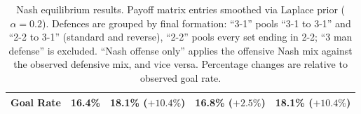 \begin{table}[h]
\begin{tabular}{lllll}
\midrule
Goal Rate & 16.4\% & 18.1\% ($+10.4\%$) & 16.8\% ($+2.5\%$) & 18.1\% ($+10.4\%$) \\
\bottomrule
\end{tabular}
\caption{Nash equilibrium results. Payoff matrix entries smoothed via Laplace prior ($\alpha = 0.2$). Defences are grouped by final formation: ``3-1'' pools ``3-1 to 3-1'' and ``2-2 to 3-1'' (standard and reverse), ``2-2'' pools every set ending in 2-2; ``3 man defense'' is excluded. ``Nash offense only'' applies the offensive Nash mix against the observed defensive mix, and vice versa. Percentage changes are relative to observed goal rate.}
\label{tab:results_alpha02}
\end{table}
